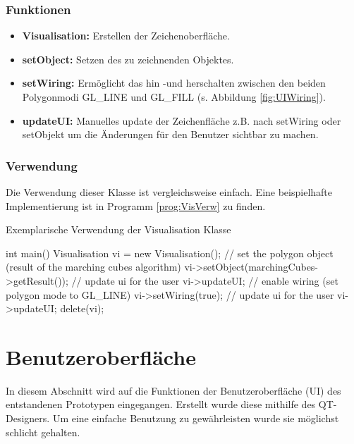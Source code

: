 \subsubsection{Funktionen}
\begin{itemize}
	\item \textbf{Visualisation:} Erstellen der Zeichenoberfläche.
	\item \textbf{setObject:} Setzen des zu zeichnenden Objektes.
	\item \textbf{setWiring:} Ermöglicht das hin -und herschalten zwischen den beiden Polygonmodi GL\_LINE und GL\_FILL (s. Abbildung \ref{fig:UIWiring}).
	\item \textbf{updateUI:} Manuelles update der Zeichenfläche z.B. nach setWiring oder setObjekt um die Änderungen für den Benutzer sichtbar zu machen.
\end{itemize}
\subsubsection{Verwendung}
Die Verwendung dieser Klasse ist vergleichsweise einfach. Eine beispielhafte Implementierung ist in Programm \ref{prog:VisVerw} zu finden.
\begin{program}[H]
	\caption{Exemplarische Verwendung der Visualisation Klasse}
	\label{prog:VisVerw}
	\begin{CCode}
		int main(){
			Visualisation vi = new Visualisation();
			// set the polygon object (result of the marching cubes algorithm)
			vi->setObject(marchingCubes->getResult());
			// update ui for the user
			vi->updateUI;
			// enable wiring (set polygon mode to GL\_LINE)
			vi->setWiring(true);
			// update ui for the user
			vi->updateUI;
			delete(vi);
		} 
	\end{CCode}
\end{program}

\section{Benutzeroberfläche}
In diesem Abschnitt wird auf die Funktionen der Benutzeroberfläche (UI) des entstandenen Prototypen eingegangen. Erstellt wurde diese mithilfe des QT-Designers. Um eine einfache Benutzung zu gewährleisten wurde sie möglichst schlicht gehalten.

